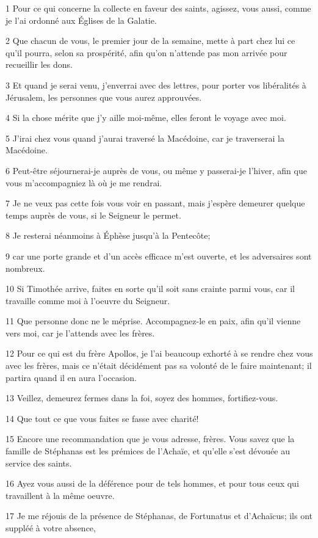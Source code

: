 \par 1 Pour ce qui concerne la collecte en faveur des saints, agissez, vous aussi, comme je l'ai ordonné aux Églises de la Galatie.
\par 2 Que chacun de vous, le premier jour de la semaine, mette à part chez lui ce qu'il pourra, selon sa prospérité, afin qu'on n'attende pas mon arrivée pour recueillir les dons.
\par 3 Et quand je serai venu, j'enverrai avec des lettres, pour porter vos libéralités à Jérusalem, les personnes que vous aurez approuvées.
\par 4 Si la chose mérite que j'y aille moi-même, elles feront le voyage avec moi.
\par 5 J'irai chez vous quand j'aurai traversé la Macédoine, car je traverserai la Macédoine.
\par 6 Peut-être séjournerai-je auprès de vous, ou même y passerai-je l'hiver, afin que vous m'accompagniez là où je me rendrai.
\par 7 Je ne veux pas cette fois vous voir en passant, mais j'espère demeurer quelque temps auprès de vous, si le Seigneur le permet.
\par 8 Je resterai néanmoins à Éphèse jusqu'à la Pentecôte;
\par 9 car une porte grande et d'un accès efficace m'est ouverte, et les adversaires sont nombreux.
\par 10 Si Timothée arrive, faites en sorte qu'il soit sans crainte parmi vous, car il travaille comme moi à l'oeuvre du Seigneur.
\par 11 Que personne donc ne le méprise. Accompagnez-le en paix, afin qu'il vienne vers moi, car je l'attends avec les frères.
\par 12 Pour ce qui est du frère Apollos, je l'ai beaucoup exhorté à se rendre chez vous avec les frères, mais ce n'était décidément pas sa volonté de le faire maintenant; il partira quand il en aura l'occasion.
\par 13 Veillez, demeurez fermes dans la foi, soyez des hommes, fortifiez-vous.
\par 14 Que tout ce que vous faites se fasse avec charité!
\par 15 Encore une recommandation que je vous adresse, frères. Vous savez que la famille de Stéphanas est les prémices de l'Achaïe, et qu'elle s'est dévouée au service des saints.
\par 16 Ayez vous aussi de la déférence pour de tels hommes, et pour tous ceux qui travaillent à la même oeuvre.
\par 17 Je me réjouis de la présence de Stéphanas, de Fortunatus et d'Achaïcus; ils ont suppléé à votre absence,

